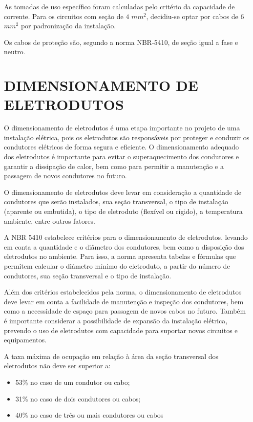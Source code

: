 As tomadas de uso específico foram calculadas pelo critério da capacidade de corrente. Para os circuitos com seção de $4$ $mm^2$, decidiu-se optar por cabos de $6$ $mm^2$ por padronização da instalação.

Os cabos de proteção são, segundo a norma NBR-5410, de seção igual a fase e neutro.

\section{DIMENSIONAMENTO DE ELETRODUTOS}

O dimensionamento de eletrodutos é uma etapa importante no projeto de uma instalação elétrica, pois os eletrodutos são responsáveis por proteger e conduzir os condutores elétricos de forma segura e eficiente. O dimensionamento adequado dos eletrodutos é importante para evitar o superaquecimento dos condutores e garantir a dissipação de calor, bem como para permitir a manutenção e a passagem de novos condutores no futuro.

O dimensionamento de eletrodutos deve levar em consideração a quantidade de condutores que serão instalados, sua seção transversal, o tipo de instalação (aparente ou embutida), o tipo de eletroduto (flexível ou rígido), a temperatura ambiente, entre outros fatores.

A NBR 5410 estabelece critérios para o dimensionamento de eletrodutos, levando em conta a quantidade e o diâmetro dos condutores, bem como a disposição dos eletrodutos no ambiente. Para isso, a norma apresenta tabelas e fórmulas que permitem calcular o diâmetro mínimo do eletroduto, a partir do número de condutores, sua seção transversal e o tipo de instalação.

Além dos critérios estabelecidos pela norma, o dimensionamento de eletrodutos deve levar em conta a facilidade de manutenção e inspeção dos condutores, bem como a necessidade de espaço para passagem de novos cabos no futuro. Também é importante considerar a possibilidade de expansão da instalação elétrica, prevendo o uso de eletrodutos com capacidade para suportar novos circuitos e equipamentos.

A taxa máxima de ocupação em relação à área da seção transversal dos
eletrodutos não deve ser superior a:


\begin{itemize}
	
	\item 53\% no caso de um condutor ou cabo;
	\item 31\% no caso de dois condutores ou cabos;
	\item 40\% no caso de três ou mais condutores ou cabos
	
\end{itemize}

